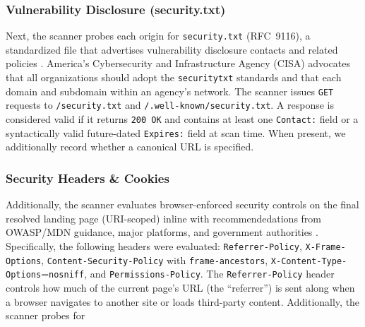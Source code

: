 \documentclass[conference]{IEEEtran}
\begin{document}


\subsubsection{Vulnerability Disclosure (security.txt)}

Next, the scanner probes each origin for \texttt{security.txt} (RFC~9116), 
a standardized file that advertises vulnerability disclosure contacts and related policies \cite{rfc9116}.
America's Cybersecurity and Infrastructure Agency (CISA) advocates that all 
organizations should adopt the \texttt{securitytxt} standards \cite{cisa_securitytxt_simple_file_big_value} and
that each domain and subdomain within an agency's network. 
The scanner issues \texttt{GET} requests to \texttt{/security.txt} and \texttt{/.well-known/security.txt}. 
A response is considered valid if it returns \texttt{200 OK} and contains at least one \texttt{Contact:} 
field or a syntactically valid future-dated \texttt{Expires:} field at scan time. 
When present, we additionally record whether a canonical URL is specified.


\subsubsection{Security Headers \& Cookies}

Additionally, the scanner evaluates browser-enforced security controls on the final resolved landing page (URI-scoped) 
inline with recommendedations from OWASP/MDN guidance, major platforms, and government authorities 
\cite{owasp_http_security_response_headers,chrome_permissions_policy,gds_security_overview_websites}. 
Specifically, the following headers were evaluated: \texttt{Referrer-Policy}, \texttt{X-Frame-Options}, 
\texttt{Content-Security-Policy} with \texttt{frame-ancestors}, \texttt{X-Content-Type-Options}=\texttt{nosniff},
 and \texttt{Permissions-Policy}. The \texttt{Referrer-Policy} header controls how much of the current 
 page's URL (the ``referrer'') is sent 
along when a browser navigates to another site or loads third-party content. Additionally, the scanner probes for  
\end{document}
